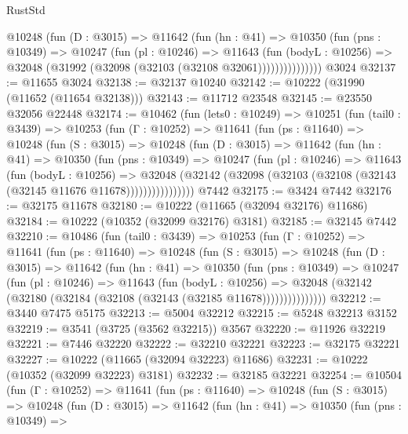 \begin{lexlean}{RustStd}
\begin{coremodule}
              @10248
                (fun (D : @3015) =>
                @11642
                  (fun (hn : @41) =>
                  @10350
                    (fun (pns : @10349) =>
                    @10247
                      (fun (pl : @10246) =>
                      @11643
                        (fun (bodyL : @10256) =>
                        @32048 (@31992 (@32098 (@32103 (@32108 @32061)))))))))))))))
    @3024
@32137 := @11655 @3024
@32138 := @32137 @10240
@32142 := @10222 (@31990 (@11652 (@11654 @32138)))
@32143 := @11712 @23548
@32145 := @23550 @32056 @22448
@32174 := @10462
    (fun (lets0 : @10249) =>
    @10251
      (fun (tail0 : @3439) =>
      @10253
        (fun (Γ : @10252) =>
        @11641
          (fun (ps : @11640) =>
          @10248
            (fun (S : @3015) =>
            @10248
              (fun (D : @3015) =>
              @11642
                (fun (hn : @41) =>
                @10350
                  (fun (pns : @10349) =>
                  @10247
                    (fun (pl : @10246) =>
                    @11643
                      (fun (bodyL : @10256) =>
                      @32048
                        (@32142
                          (@32098 (@32103 (@32108 (@32143 (@32145 @11676 @11678))))))))))))))))
    @7442
@32175 := @3424 @7442
@32176 := @32175 @11678
@32180 := @10222 (@11665 (@32094 @32176) @11686)
@32184 := @10222 (@10352 (@32099 @32176) @3181)
@32185 := @32145 @7442
@32210 := @10486
    (fun (tail0 : @3439) =>
    @10253
      (fun (Γ : @10252) =>
      @11641
        (fun (ps : @11640) =>
        @10248
          (fun (S : @3015) =>
          @10248
            (fun (D : @3015) =>
            @11642
              (fun (hn : @41) =>
              @10350
                (fun (pns : @10349) =>
                @10247
                  (fun (pl : @10246) =>
                  @11643
                    (fun (bodyL : @10256) =>
                    @32048 (@32142 (@32180 (@32184 (@32108 (@32143 (@32185 @11678)))))))))))))))
@32212 := @3440 @7475 @5175
@32213 := @5004 @32212
@32215 := @5248 @32213 @3152
@32219 := @3541 (@3725 (@3562 @32215)) @3567
@32220 := @11926 @32219
@32221 := @7446 @32220
@32222 := @32210 @32221
@32223 := @32175 @32221
@32227 := @10222 (@11665 (@32094 @32223) @11686)
@32231 := @10222 (@10352 (@32099 @32223) @3181)
@32232 := @32185 @32221
@32254 := @10504
    (fun (Γ : @10252) =>
    @11641
      (fun (ps : @11640) =>
      @10248
        (fun (S : @3015) =>
        @10248
          (fun (D : @3015) =>
          @11642
            (fun (hn : @41) =>
            @10350
              (fun (pns : @10349) =>

\end{coremodule}
\end{lexlean}
